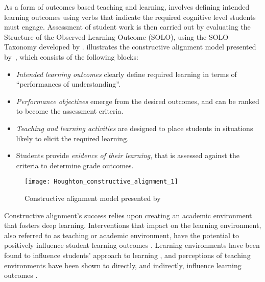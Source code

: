 As a form of outcomes based teaching and learning, \CA involves defining intended learning outcomes using verbs that indicate the required cognitive level students must engage. Assessment of student work is then carried out by evaluating the Structure of the Observed Learning Outcome (SOLO), using the SOLO Taxonomy developed by \citet{Biggs:1982}.  illustrates the constructive alignment model presented by~\citet{Houghton:2004}, which consists of the following blocks:

\begin{itemize}
  \item \emph{Intended learning outcomes} clearly define required learning in terms of ``performances of understanding''.
  \item \emph{Performance objectives} emerge from the desired outcomes, and can be ranked to become the assessment criteria.
  \item \emph{Teaching and learning activities} are designed to place students in situations likely to elicit the required learning.
  \item Students provide \emph{evidence of their learning}, that is assessed against the criteria to determine grade outcomes.
\end{itemize}

\begin{figure}[htbp]
  \centering
  \texttt{[image: Houghton\_constructive\_alignment\_1]}
  \caption{Constructive alignment model presented by ~\citet{Houghton:2004}}
  \label{fig:constructive_alignment}
\end{figure}

Constructive alignment's success relies upon creating an academic environment that fosters deep learning. Interventions that impact on the learning environment, also referred to as teaching or academic environment, have the potential to positively influence student learning outcomes \cite{Trigwell:1991}. Learning environments have been found to influence students' approach to learning \cite{Entwistle:1990,Entwistle:1991,Kember:2007}, and perceptions of teaching environments have been shown to directly, and indirectly, influence learning outcomes \cite{Meyer:1990,Lizzio:2002}.




